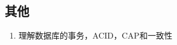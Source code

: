 \documentclass[letterpaper,10pt,english]{sphinxmanual}
\begin{document}
\subsection{其他}
\label{\detokenize{else/02_interview:id6}}\begin{enumerate}
\item {} 
理解数据库的事务，ACID，CAP和一致性

\end{enumerate}
\begin{quote}

\end{quote}



\renewcommand{\indexname}{Index}
\printindex
\end{document}
